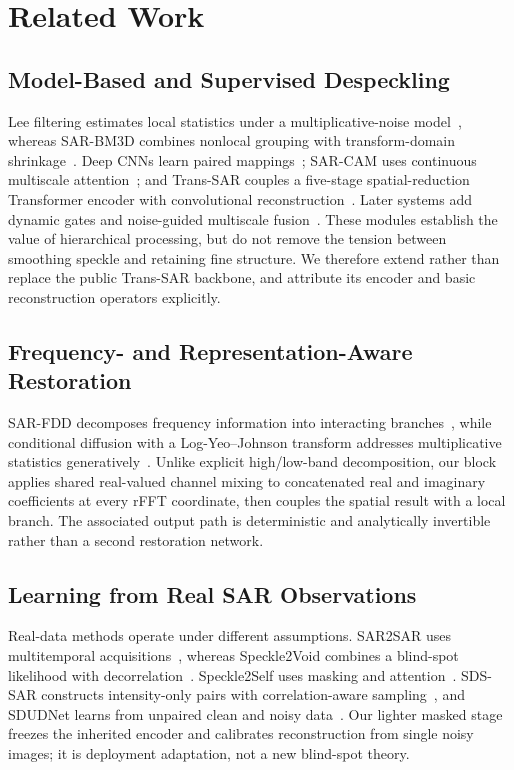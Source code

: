 \documentclass[conference]{IEEEtran}
\begin{document}
\section{Related Work}
\subsection{Model-Based and Supervised Despeckling}
Lee filtering estimates local statistics under a multiplicative-noise model~\cite{lee1980}, whereas SAR-BM3D combines nonlocal grouping with transform-domain shrinkage~\cite{parrilli2012}. Deep CNNs learn paired mappings~\cite{chierchia2017}; SAR-CAM uses continuous multiscale attention~\cite{ko2022}; and Trans-SAR couples a five-stage spatial-reduction Transformer encoder with convolutional reconstruction~\cite{perera2022}. Later systems add dynamic gates and noise-guided multiscale fusion~\cite{shen2025,zhang2025}. These modules establish the value of hierarchical processing, but do not remove the tension between smoothing speckle and retaining fine structure. We therefore extend rather than replace the public Trans-SAR backbone, and attribute its encoder and basic reconstruction operators explicitly.

\subsection{Frequency- and Representation-Aware Restoration}
SAR-FDD decomposes frequency information into interacting branches~\cite{zhao2024}, while conditional diffusion with a Log-Yeo--Johnson transform addresses multiplicative statistics generatively~\cite{ma2024}. Unlike explicit high/low-band decomposition, our block applies shared real-valued channel mixing to concatenated real and imaginary coefficients at every rFFT coordinate, then couples the spatial result with a local branch. The associated output path is deterministic and analytically invertible rather than a second restoration network.

\subsection{Learning from Real SAR Observations}
Real-data methods operate under different assumptions. SAR2SAR uses multitemporal acquisitions~\cite{dalsasso2021}, whereas Speckle2Void combines a blind-spot likelihood with decorrelation~\cite{molini2022}. Speckle2Self uses masking and attention~\cite{lin2025}. SDS-SAR constructs intensity-only pairs with correlation-aware sampling~\cite{chen2026}, and SDUDNet learns from unpaired clean and noisy data~\cite{bo2025}. Our lighter masked stage freezes the inherited encoder and calibrates reconstruction from single noisy images; it is deployment adaptation, not a new blind-spot theory.
\end{document}
